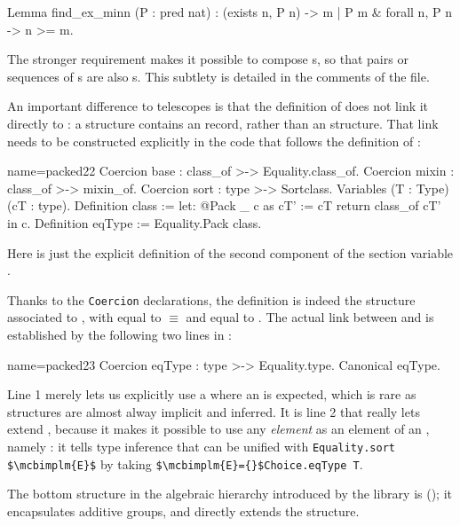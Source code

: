 \begin{coq}{}{}
Lemma find_ex_minn (P : pred nat)  :
  (exists n, P n) -> {m | P m & forall n, P n -> n >= m}.
\end{coq}
The stronger requirement
makes it possible to compose s, so that pairs or
sequences of s are also s.  This subtlety
is detailed in the comments of the  file.

An important difference to telescopes is that the definition of
 does not link it directly to : a
 structure contains an  record, rather
than an  structure. That link needs to be constructed
explicitly in the code that follows the definition of :

\begin{coq}{name=packed22}{}
Coercion base : class_of >-> Equality.class_of.
Coercion mixin : class_of >-> mixin_of.
Coercion sort : type >-> Sortclass.
Variables (T : Type) (cT : type).
Definition class := let: @Pack _ c as cT' := cT return class_of cT' in c.
Definition eqType := Equality.Pack class.
\end{coq}

Here  is just the explicit definition of the second component
of the section variable .

Thanks to the \lstinline/Coercion/ declarations, the  definition is
indeed the  structure associated to , with 
equal to ${}\equiv{}$ and  equal to .
The actual link between  and  is established
by the following two lines in :

\begin{coq}{name=packed23}{}
Coercion eqType : type >-> Equality.type.
Canonical eqType.
\end{coq}

Line 1 merely lets us explicitly use a  where an
 is expected, which is rare as structures are almost alway
implicit and inferred.  It is line 2 that really lets 
extend , because it makes it possible to use any
\emph{element}  as an element of an ,
namely : it tells type inference that 
can be unified with \lstinline/Equality.sort $\mcbimplm{E}$/ by taking
\lstinline/$\mcbimplm{E}={}$Choice.eqType T/.

The bottom structure in the \mcbMC{} algebraic hierarchy introduced by
the  library is  (); it
encapsulates additive groups, and directly extends the 
structure.

